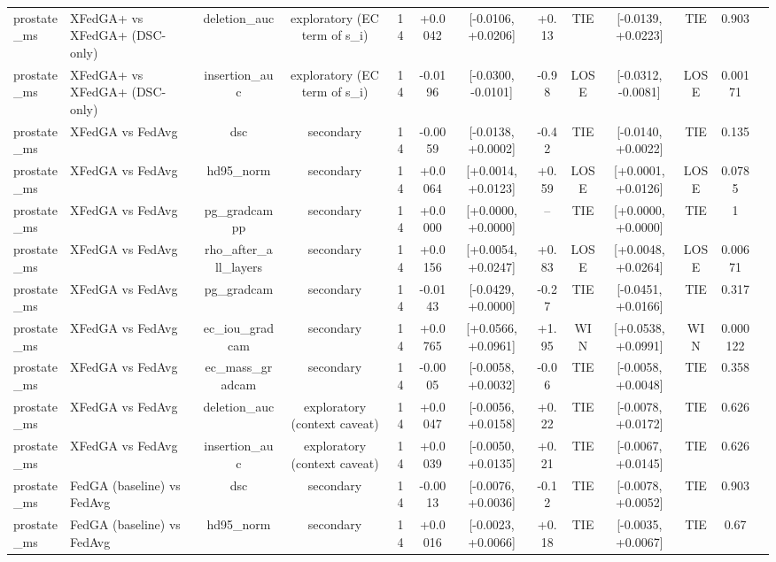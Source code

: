 \begin{tabular}{llccccccccccc}
prostate\_ms & XFedGA+ vs XFedGA+ (DSC-only) & deletion\_auc & exploratory (EC term of s\_i) & 14 & +0.0042 & [-0.0106, +0.0206] & +0.13 & TIE & [-0.0139, +0.0223] & TIE & 0.903 &  \\
prostate\_ms & XFedGA+ vs XFedGA+ (DSC-only) & insertion\_auc & exploratory (EC term of s\_i) & 14 & -0.0196 & [-0.0300, -0.0101] & -0.98 & LOSE & [-0.0312, -0.0081] & LOSE & 0.00171 &  \\
prostate\_ms & XFedGA vs FedAvg & dsc & secondary & 14 & -0.0059 & [-0.0138, +0.0002] & -0.42 & TIE & [-0.0140, +0.0022] & TIE & 0.135 &  \\
prostate\_ms & XFedGA vs FedAvg & hd95\_norm & secondary & 14 & +0.0064 & [+0.0014, +0.0123] & +0.59 & LOSE & [+0.0001, +0.0126] & LOSE & 0.0785 &  \\
prostate\_ms & XFedGA vs FedAvg & pg\_gradcampp & secondary & 14 & +0.0000 & [+0.0000, +0.0000] & – & TIE & [+0.0000, +0.0000] & TIE & 1 &  \\
prostate\_ms & XFedGA vs FedAvg & rho\_after\_all\_layers & secondary & 14 & +0.0156 & [+0.0054, +0.0247] & +0.83 & LOSE & [+0.0048, +0.0264] & LOSE & 0.00671 &  \\
prostate\_ms & XFedGA vs FedAvg & pg\_gradcam & secondary & 14 & -0.0143 & [-0.0429, +0.0000] & -0.27 & TIE & [-0.0451, +0.0166] & TIE & 0.317 &  \\
prostate\_ms & XFedGA vs FedAvg & ec\_iou\_gradcam & secondary & 14 & +0.0765 & [+0.0566, +0.0961] & +1.95 & WIN & [+0.0538, +0.0991] & WIN & 0.000122 &  \\
prostate\_ms & XFedGA vs FedAvg & ec\_mass\_gradcam & secondary & 14 & -0.0005 & [-0.0058, +0.0032] & -0.06 & TIE & [-0.0058, +0.0048] & TIE & 0.358 &  \\
prostate\_ms & XFedGA vs FedAvg & deletion\_auc & exploratory (context caveat) & 14 & +0.0047 & [-0.0056, +0.0158] & +0.22 & TIE & [-0.0078, +0.0172] & TIE & 0.626 &  \\
prostate\_ms & XFedGA vs FedAvg & insertion\_auc & exploratory (context caveat) & 14 & +0.0039 & [-0.0050, +0.0135] & +0.21 & TIE & [-0.0067, +0.0145] & TIE & 0.626 &  \\
prostate\_ms & FedGA (baseline) vs FedAvg & dsc & secondary & 14 & -0.0013 & [-0.0076, +0.0036] & -0.12 & TIE & [-0.0078, +0.0052] & TIE & 0.903 &  \\
prostate\_ms & FedGA (baseline) vs FedAvg & hd95\_norm & secondary & 14 & +0.0016 & [-0.0023, +0.0066] & +0.18 & TIE & [-0.0035, +0.0067] & TIE & 0.67 &  \\

\end{tabular}
